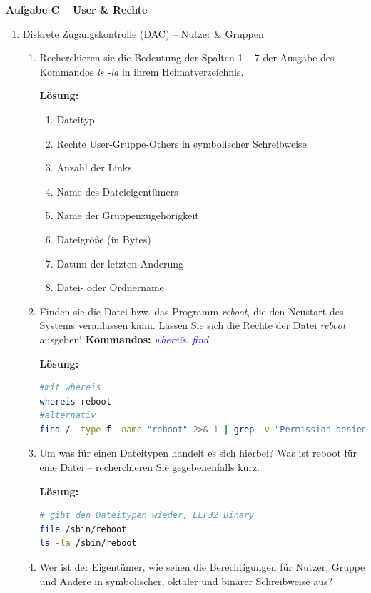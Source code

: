 \documentclass[paper=a4,fontsize=11pt]{scrartcl}%
\numberwithin{equation}{section}
\newenvironment{solution}
	{
		\color{blue}
		\textbf{Lösung:}
	}{}
\begin{document}
\begin{center}\Large{\textbf{Aufgabe C -- User \& Rechte}}\end{center}\vskip0.25in
\begin{enumerate}
\item Diskrete Zugangskontrolle (DAC) -- Nutzer \& Gruppen
	\begin{enumerate}[label=(\alph*)]
        \item Recherchieren sie die Bedeutung der Spalten 1 -- 7 der Ausgabe des Kommandos \emph{ls -la} in ihrem Heimatverzeichnis.
        
        \begin{solution}
         \begin{enumerate}
        		\item Dateityp
        		\item Rechte User-Gruppe-Others in symbolischer Schreibweise
        		\item Anzahl der Links
        		\item Name des Dateieigentümers
        		\item Name der Gruppenzugehörigkeit
        		\item Dateigröße (in Bytes)
        		\item Datum der letzten Änderung
        		\item Datei- oder Ordnername
        \end{enumerate}
        \end{solution}
        \item Finden sie die Datei bzw. das Programm \textit{reboot}, die den Neustart des Systems veranlassen kann. Lassen Sie sich die Rechte der Datei \textit{reboot} ausgeben!
        \textbf{Kommandos:} \textcolor{blue}{\emph{whereis}, \emph{find}}
        
        \begin{solution}
        \begin{lstlisting}[style=Bash, language=Bash]
#mit whereis
whereis reboot
#alternativ
find / -type f -name "reboot" 2>& 1 | grep -v "Permission denied"
		\end{lstlisting}
		\end{solution}
        \item Um was für einen Dateitypen handelt es sich hierbei? Was ist reboot für eine Datei -- recherchieren Sie gegebenenfalls kurz.
        
        \begin{solution}
        \begin{lstlisting}[style=Bash, language=Bash]
# gibt den Dateitypen wieder, ELF32 Binary
file /sbin/reboot
ls -la /sbin/reboot
		\end{lstlisting}
		\end{solution}
        \item Wer ist der Eigentümer, wie sehen die Berechtigungen für Nutzer, Gruppe und Andere in symbolischer, oktaler und binärer Schreibweise aus?
        

\end{enumerate}
\end{enumerate}
\end{document}
